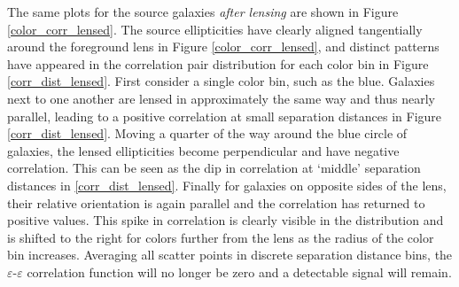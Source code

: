 \documentclass[%
 reprint,
 amsmath,amssymb,
 aps,nofootinbib
]{revtex4-1}
\begin{document}
The same plots for the source galaxies \textit{after lensing} are shown in Figure \ref{color_corr_lensed}. The source ellipticities have clearly aligned tangentially around the foreground lens in Figure \ref{color_corr_lensed}, and distinct patterns have appeared in the correlation pair distribution for each color bin in Figure \ref{corr_dist_lensed}. First consider a single color bin, such as the blue. Galaxies next to one another are lensed in approximately the same way and thus nearly parallel, leading to a positive correlation at small separation distances in Figure \ref{corr_dist_lensed}. Moving a quarter of the way around the blue circle of galaxies, the lensed ellipticities become perpendicular and have negative correlation. This can be seen as the dip in correlation at `middle' separation distances in \ref{corr_dist_lensed}. Finally for galaxies on opposite sides of the lens, their relative orientation is again parallel and the correlation has returned to positive values. This spike in correlation is clearly visible in the distribution and is shifted to the right for colors further from the lens as the radius of the color bin increases. Averaging all scatter points in discrete separation distance bins, the $\varepsilon$-$\varepsilon$ correlation function will no longer be zero and a detectable signal will remain.

\end{document}
